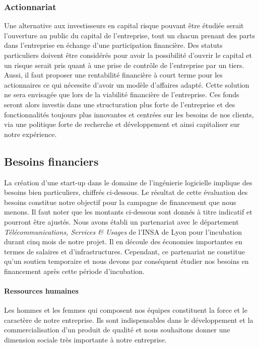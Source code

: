 \documentclass[10pt,twocolumn,a4paper,utf8x]{article}
\begin{document}
\subsubsection{Actionnariat}

Une alternative aux investisseurs en capital risque pouvant être étudiée
serait l'ouverture au public du capital de l'entreprise, tout un chacun
prenant des parts dans l'entreprise en échange d'une participation
financière. Des statuts particuliers doivent être considérés pour avoir
la possibilité d'ouvrir le capital et un risque serait pris quant à une
prise de contrôle de l'entreprise par un tiers. Aussi, il faut proposer
une rentabilité financière à court terme pour les actionnaires ce qui
nécessite d'avoir un modèle d'affaires adapté. Cette solution ne sera
envisagée que lors de la viabilité financière de l'entreprise. Ces fonds
seront alors investis dans une structuration plus forte de l'entreprise
et des fonctionnalités toujours plus innovantes et centrées sur les
besoins de nos clients, via une politique forte de recherche et
développement et ainsi capitaliser sur notre expérience.

\subsection{Besoins financiers}

La création d'une start-up dans le domaine de l'ingénierie logicielle
implique des besoins bien particuliers, chiffrés ci-dessous. Le résultat
de cette évaluation des besoins constitue notre objectif pour la
campagne de financement que nous menons. Il faut noter que les montants
ci-dessous sont donnés à titre indicatif et pourront être ajustés. Nous
avons établi un partenariat avec le département
\emph{Télécommunications, Services \& Usages} de l'INSA de Lyon pour
l'incubation durant cinq mois de notre projet. Il en découle des
économies importantes en termes de salaires et d'infrastructures.
Cependant, ce partenariat ne constitue qu'un soutien temporaire et nous
devons par conséquent étudier nos besoins en financement après cette
période d'incubation.

\paragraph{Ressources humaines}

Les hommes et les femmes qui composent nos équipes constituent la force
et le caractère de notre entreprise. Ils sont indispensables dans le
développement et la commercialisation d'un produit de qualité et nous
souhaitons donner une dimension sociale très importante à notre
entreprise.
\end{document}
